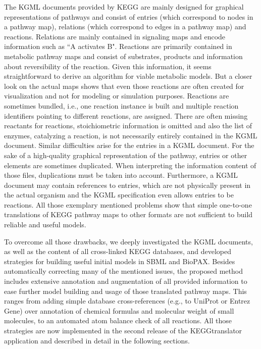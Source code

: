 \documentclass[10pt]{bmc_article}
\newenvironment{bmcformat}{\baselineskip20pt\sloppy\setboolean{publ}{false}}{\baselineskip20pt\sloppy}
\begin{document}
\begin{bmcformat}
The KGML documents provided by KEGG are mainly designed for graphical representations of pathways and consist of entries (which correspond to nodes in a pathway map), relations (which correspond to edges in a pathway map) and reactions. Relations are mainly contained in signaling maps and encode information such as ``A activates B". Reactions are primarily contained in metabolic pathway maps and consist of substrates, products and information about reversibility of the reaction. Given this information, it seems straightforward to derive an algorithm for viable metabolic models. But a closer look on the actual maps shows that even those reactions are often created for visualization and not for modeling or simulation purposes. Reactions are sometimes bundled, i.e., one reaction instance is built and multiple reaction identifiers pointing to different reactions, are assigned. There are often missing reactants for reactions, stoichiometric information is omitted and also the list of enzymes, catalyzing a reaction, is not necessarily entirely contained in the KGML document. Similar difficulties arise for the entries in a KGML document.
For the sake of a high-quality graphical representation of the pathway, entries or other elements are sometimes duplicated.%
When interpreting the information content of those files, duplications must be taken into account.
%
Furthermore, a KGML document may contain references to entries, which are not physically present in the actual organism and the KGML specification even allows entries to be reactions.
All those exemplary mentioned problems show that simple one-to-one translations of KEGG pathway maps to other formats are not sufficient to build reliable and useful models.

To overcome all those drawbacks, we deeply investigated the KGML documents, as well as the content of all cross-linked KEGG databases, and developed strategies for building useful initial models in SBML and BioPAX. Besides automatically correcting many of the mentioned issues, the proposed method includes extensive annotation and augmentation of all provided information to ease further model building and usage of those translated pathway maps. This ranges from adding simple database cross-references (e.g., to UniProt or Entrez Gene) over annotation of chemical formulas and molecular weight of small molecules, to an automated atom balance check of all reactions. All those strategies are now implemented in the second release of the KEGGtranslator application \cite{Wrzodek2011} and described in detail in the following sections.





\end{bmcformat}
\end{document}
